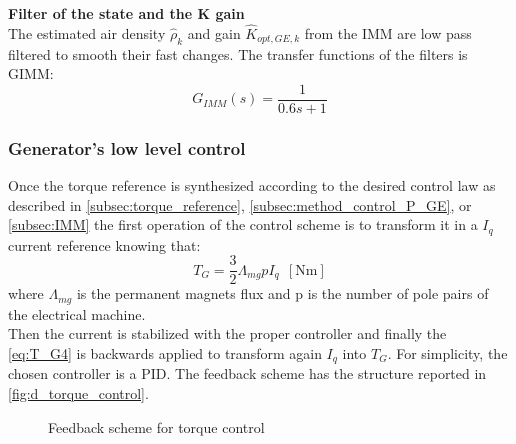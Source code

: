 \textbf{Filter of the state and the K gain}\\
The estimated air density $\hat{\rho}_{k}$ and gain $\hat{K}_{opt,GE,k}$ from the IMM are low pass filtered to smooth their fast changes. The transfer functions of the filters is \acrshort{GIMM}:  
\begin{equation}
  G_{IMM}(s) = \frac{1}{0.6s + 1}
\end{equation}

                                          

\subsubsection{Generator's low level control}\label{subsec:generator_low_level-control}
Once the torque reference is synthesized according to the desired control law as described in \autoref{subsec:torque_reference}, \ref{subsec:method_control_P_GE}, or \ref{subsec:IMM} the first operation of the control scheme is to transform it in a $I_q$ current reference knowing that:
\begin{equation}
    T_G = \frac{3}{2}\Lambda_{mg} p I_q \ \ \left[\si{\newton\meter}\right]
    \label{eq:T_G4}
\end{equation}
where $\Lambda_{mg}$ is the permanent magnets flux and p is the number of pole pairs of the electrical machine.\\
Then the current is stabilized with the proper controller and finally the \autoref{eq:T_G4} is backwards applied to transform again $I_q$ into $T_G$. For simplicity, the chosen controller is a \acrfull{PID}. The feedback scheme has the structure reported in \autoref{fig:d_torque_control}.

\begin{figure}[H]
    \centering
    
    \caption{Feedback scheme for torque control}
    \label{fig:d_torque_control}
\end{figure}

